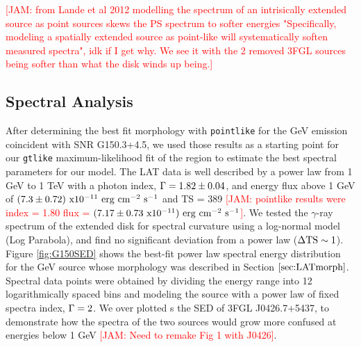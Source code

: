 \documentclass[iop]{emulateapj}
\newcommand{\kibitz}[2]{\ifnum\Comments=1\textcolor{#1}{#2}\fi}
\newcommand{\jamie}[1]{\kibitz{red}      {[JAM: #1]}}
\newcommand{\gam}{$\gamma$-ray}
\newcommand{\ptlike}{{\tt pointlike}}
\newcommand{\gtlike}{{\tt gtlike}}
\newcommand{\Gone}{G150.3+4.5}
\newcommand{\psrLike}{3FGL J0426.7+5437}
\begin{document}
\jamie{from Lande et al 2012  modelling the spectrum of an intrisically extended source as point sources skews the PS spectrum to softer energies "Specifically, modeling a spatially extended source as point-like will systematically soften measured spectra", idk if I get why. We see it with the 2 removed 3FGL sources being softer than what the disk winds up being.}




\subsection{Spectral Analysis}\label{sec:LATspec}
After determining the best fit morphology with \ptlike{} for the GeV emission coincident with SNR \Gone{}, we used those results as a starting point for our \gtlike{} maximum-likelihood fit of the region to estimate the best spectral parameters for our model. The LAT data is well described by a power law from 1 GeV to 1 TeV with a photon index, ${\rm \Gamma = 1.82 \pm 0.04}$, and energy flux above 1 GeV of ${\rm (7.3 \pm 0.72)~ x 10^{-11}~ erg~cm^{-2}~ s^{-1}}$  and TS = 389 \jamie{pointlike results were index = 1.80 flux = ${\rm (7.17 \pm 0.73~ x 10^{-11})~ erg~cm^{-2}~ s^{-1}}$}. We tested the \gam{} spectrum of the extended disk for spectral curvature using a log-normal model (Log Parabola), and find no significant deviation from a power law (${\rm \Delta TS \sim 1}$). Figure \ref{fig:G150SED} shows the best-fit power law spectral energy distribution for the GeV source whose morphology was described in Section $\ref{sec:LATmorph}$. Spectral data points were obtained by dividing the energy range into 12 logarithmically spaced bins and modeling the source with a power law of fixed spectra index, ${\rm \Gamma = 2}$. We over plotted s the SED of \psrLike{}, to demonstrate how the spectra of the two sources would grow more confused at energies below 1 GeV \jamie{Need to remake Fig 1 with J0426}.
\end{document}
